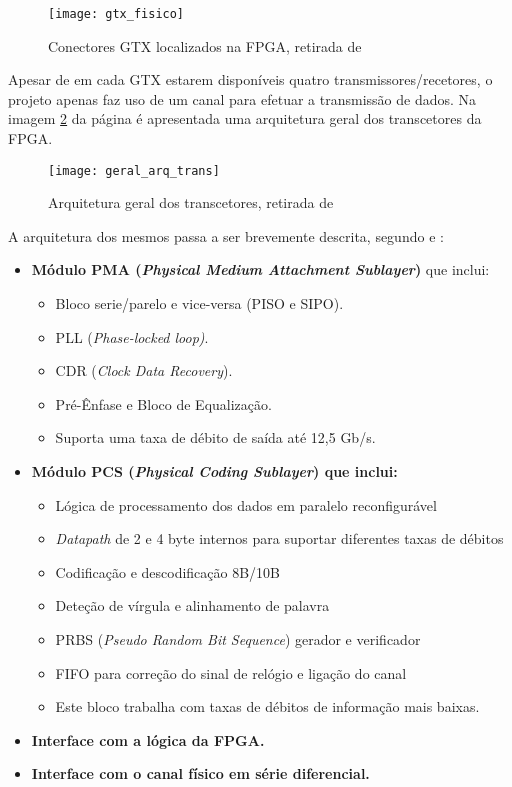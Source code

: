 \begin{figure}[h!]
	\begin{center}
		\leavevmode
		\texttt{[image: gtx\_fisico]}
		\caption{Conectores GTX localizados na FPGA, retirada de \cite{R008}}
		\label{fig:gtx_fis}
	\end{center}
\end{figure}

Apesar de em cada GTX estarem disponíveis quatro transmissores/recetores, o projeto apenas faz uso de um canal para efetuar a transmissão de dados. Na imagem \ref{fig:gtx_geral_arq} da página \pageref{fig:gtx_geral_arq} é apresentada uma arquitetura geral dos transcetores da FPGA.

\begin{figure}[h!]
	\begin{center}
		\leavevmode
		\texttt{[image: geral\_arq\_trans]}
		\caption{Arquitetura geral dos transcetores, retirada de \cite{R010}}
		\label{fig:gtx_geral_arq}
	\end{center}
\end{figure}


A arquitetura dos mesmos passa a ser brevemente descrita, segundo \cite{R010} e \cite{R011}:
\begin{itemize}
	\item \textbf{Módulo PMA (\textit{Physical Medium Attachment Sublayer})} que inclui:
	\begin{itemize}
		\item Bloco serie/parelo e vice-versa (PISO e SIPO).
		\item PLL (\textit{Phase-locked loop)}.
		\item CDR (\textit{Clock Data Recovery}).
		\item Pré-Ênfase e Bloco de Equalização.
		\item Suporta uma taxa de débito de saída até 12,5 Gb/s.
		\end{itemize}
	\item \textbf{Módulo PCS (\textit{Physical Coding Sublayer}) que inclui:}
	\begin{itemize}
		\item Lógica de processamento dos dados em paralelo reconfigurável
		\item \textit{Datapath} de 2 e 4 byte internos para suportar diferentes taxas de débitos
		\item Codificação e descodificação 8B/10B
		\item Deteção de vírgula e alinhamento de palavra
		\item PRBS (\textit{Pseudo Random Bit Sequence}) gerador e verificador
		\item FIFO para correção do sinal de relógio e ligação do canal
		\item Este bloco trabalha com taxas de débitos de informação mais baixas.
	\end{itemize}
	\item \textbf{Interface com a lógica da FPGA.}
	\item \textbf{Interface com o canal físico em série diferencial.}
\end{itemize}

